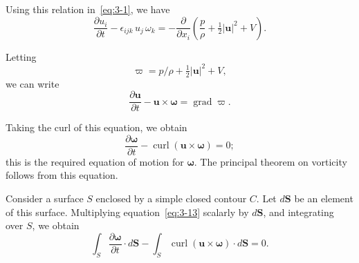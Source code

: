 Using this relation in~\eqref{eq:3-1}, we have
\begin{equation}\label{eq:3-10}
\frac{\partial u_i}{\partial t} - \epsilon_{ijk}\, u_j\, \omega_k = -\frac{\partial}{\partial x_i}\!\left(\frac{p}{\rho} + \tfrac{1}{2}|\mathbf{u}|^2 + V\right).
\end{equation}

Letting
\begin{equation}\label{eq:3-11}
\varpi = p/\rho + \tfrac{1}{2}|\mathbf{u}|^2 + V,
\end{equation}
we can write
\begin{equation}\label{eq:3-12}
\frac{\partial \mathbf{u}}{\partial t} - \mathbf{u}\times\boldsymbol{\omega} = \operatorname{grad}\varpi.
\end{equation}

Taking the curl of this equation, we obtain
\begin{equation}\label{eq:3-13}
\frac{\partial\boldsymbol{\omega}}{\partial t} - \operatorname{curl}(\mathbf{u}\times\boldsymbol{\omega}) = 0;
\end{equation}
this is the required equation of motion for $\boldsymbol{\omega}$. The principal theorem on vorticity follows from this equation.

Consider a surface $S$ enclosed by a simple closed contour $C$. Let $d\mathbf{S}$ be an element of this surface. Multiplying equation~\eqref{eq:3-13} scalarly by $d\mathbf{S}$, and integrating over $S$, we obtain
\begin{equation}\label{eq:3-14}
\int_S \frac{\partial\boldsymbol{\omega}}{\partial t}\cdot d\mathbf{S} - \int_S \operatorname{curl}(\mathbf{u}\times\boldsymbol{\omega})\cdot d\mathbf{S} = 0.
\end{equation}


